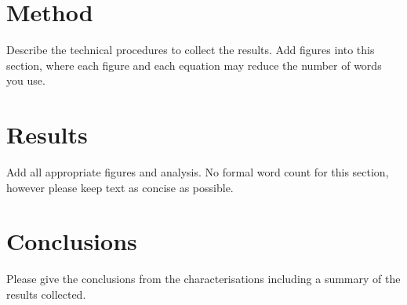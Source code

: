 \documentclass[12pt]{article}
\begin{document}
\section*{Method}
Describe the technical procedures to collect the results.
Add figures into this section, where
each figure and each equation may reduce the number of words you use.

\section*{Results}
Add all appropriate figures and analysis.
No formal word count for this section, however
please keep text as concise as possible.

\section*{Conclusions}
Please give the conclusions from the characterisations including a summary of the results collected.
\end{document}
